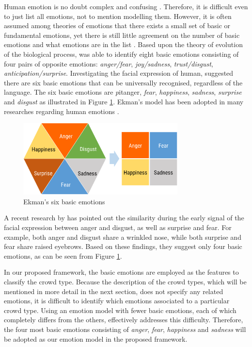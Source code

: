 Human emotion is no doubt complex and confusing \citet{plutchik2001nature}. Therefore, it is difficult even to just list all emotions, not to mention modelling them. However, it is often assumed among theories of emotions that there exists a small set of basic or fundamental emotions, yet there is still little agreement on the number of basic emotions and what emotions are in the list \citep{Ortony1990}. Based upon the theory of evolution of the biological process, \citet{plutchik2001integration} was able to identify eight basic emotions consisting of four pairs of opposite emotions: \textit{anger/fear}, \textit{joy/sadness}, \textit{trust/disgust}, \textit{anticipation/surprise}. Investigating the facial expression of human, \citet{ekman1971constants} suggested there are six basic emotions that can be universally recognised, regardless of the language. The six basic emotions are \textit pit{anger}, \textit{fear}, \textit{happiness}, \textit{sadness}, \textit{surprise} and \textit{disgust} as illustrated in Figure \ref{fig:emotionModel}. Ekman's model has been adopted in many researches regarding human emotions \citep{mohammad2014using, roberts2012empatweet, alm2005emotions}. 

\begin{figure}[htb!]
\centering    
\includegraphics[width=0.75\textwidth]{EkmanModel}
\caption{Ekman's six basic emotions}
\label{fig:emotionModel}
\end{figure}

A recent research by \cite{Jack2014} has pointed out the similarity during the early signal of the facial expression between anger and disgust, as well as surprise and fear. For example, both anger and disgust share a wrinkled nose, while both surprise and fear share raised eyebrows. Based on these findings, they suggest only four basic emotions, as can be seen from Figure \ref{fig:emotionModel}.

In our proposed framework, the basic emotions are employed as the features to classify the crowd type. Because the description of the crowd types, which will be mentioned in more detail in the next section, does not specify any related emotions, it is difficult to identify which emotions associated to a particular crowd type. Using an emotion model with fewer basic emotions, each of which completely differs from the others, effectively addresses this difficulty. Therefore, the four most basic emotions consisting of \textit{anger}, \textit{fear}, \textit{happiness} and \textit{sadness} will be adopted as our emotion model in the proposed framework.

